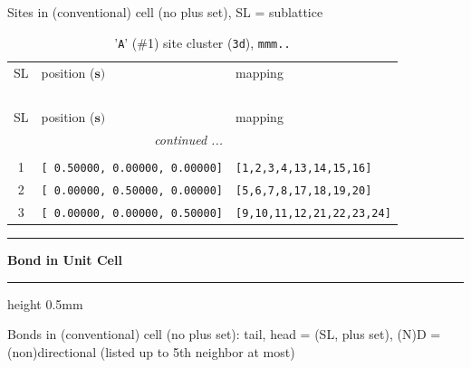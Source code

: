 \documentclass[fleqn,10pt,landscape]{jsarticle}
\begin{document}
\noindent Sites in (conventional) cell (no plus set), SL = sublattice

\renewcommand{\arraystretch}{1.6}
\begin{longtable}[l]{cll}
\captionsetup{justification=raggedright, singlelinecheck=off}
\caption{'\texttt{A}' (\#1) site cluster (\texttt{3d}), \texttt{mmm..}}
 \\
 \hline \hline
SL & position ($\bm{s})$ & mapping \\ \hline \endfirsthead

\multicolumn{2}{l}{\tablename\ \thetable{}} \\
 \hline \hline
SL & position ($\bm{s})$ & mapping \\ \hline \endhead

 \hline \hline
\multicolumn{2}{r}{\footnotesize\it continued ...} \\ \endfoot

 \hline \hline
\multicolumn{2}{r}{} \\ \endlastfoot

1 & \texttt{[ 0.50000, 0.00000, 0.00000]} & \texttt{[1,2,3,4,13,14,15,16]} \\ \hline
2 & \texttt{[ 0.00000, 0.50000, 0.00000]} & \texttt{[5,6,7,8,17,18,19,20]} \\ \hline
3 & \texttt{[ 0.00000, 0.00000, 0.50000]} & \texttt{[9,10,11,12,21,22,23,24]} \\
\end{longtable}
\vspace{5mm}
\noindent \rule[0.5mm]{5mm}{0.5mm}\hspace{3mm}\textbf{Bond in Unit Cell}\hspace{3mm}\leaders\hrule height 0.5mm\hfill\kern0pt
\vspace{3mm}

\noindent Bonds in (conventional) cell (no plus set): tail, head = (SL, plus set), (N)D = (non)directional (listed up to 5th neighbor at most)
\end{document}
